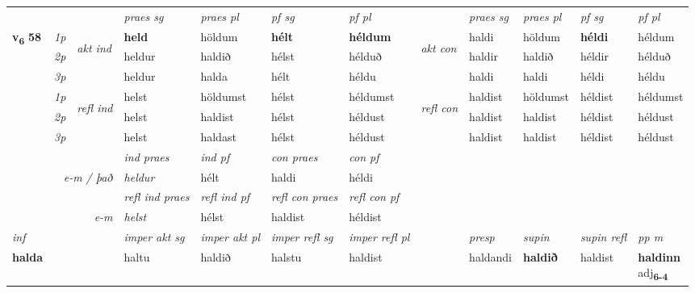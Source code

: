 \begin{longtable}[l]{X>{\footnotesize\itshape}llXXXXlXXXX}
\midrule

\midrule
 & &   & \textit{praes sg}  & \textit{praes pl}    & \textit{ pf sg} & \textit{pf pl} & & \textit{praes sg}  & \textit{praes pl}    & \textit{pf sg} & \textit{pf pl }  \\ \cmidrule{4-7} \cmidrule{9-12}
 \multirow{2}{*}{{{\textbf{v{\textsubscript{6}}} \Large{\textbf{58}}}}}  & 1p & \multirow{3}{*}{\begin{turn}{90}\textit{akt ind}\end{turn}} & \textbf{held} & höldum & \textbf{hélt} & \textbf{héldum} & \multirow{3}{*}{\begin{turn}{90}\textit{akt con}\end{turn}} &haldi & höldum & \textbf{héldi} & héldum\\*
 & 2p &  &  heldur  & haldið & hélst & hélduð & & haldir & haldið & héldir & hélduð \\*
 & 3p &  & heldur & halda & hélt & héldu & & haldi & haldi& héldi & héldu \\*
\cmidrule{4-7} \cmidrule{9-12}
 & 1p & \multirow{3}{*}{\begin{turn}{90}\textit{refl ind}\end{turn}}  & helst & höldumst & hélst & héldumst & \multirow{3}{*}{\begin{turn}{90}\textit{refl con}\end{turn}}  &haldist & höldumst & héldist & héldumst \\*
 & 2p &  & helst & haldist & hélst & héldust & &haldist & haldist & héldist & héldust \\*
 & 3p  & & helst & haldast & hélst & héldust & & haldist & haldist& héldist & héldust \\*
\cmidrule{4-7} \cmidrule{9-12}

   && &  \textit{ind praes} & \textit{ind pf} & \textit{con praes} & \textit{con pf} \\*
\multicolumn{3}{r}{\textit{e-m / það}} & heldur & hélt & haldi & héldi \\*

\cmidrule{4-7}
 & && \textit{refl ind praes} & \textit{refl ind pf} & \textit{refl con praes} & \textit{refl con pf} \\*
\multicolumn{3}{r}{\textit{e-m}}& helst & hélst & haldist & héldist \\*

\cmidrule{4-7}
   {\textit{inf}} & &  & \textit{imper akt sg} & \textit{imper akt pl} & \textit{imper refl sg} & \textit{imper refl pl} && \textit{presp} & \textit{supin} & \textit{supin refl} & \textit{pp m} \\*
  {\textbf{halda}} & && haltu  & haldið & halstu & haldist && haldandi &  \textbf{haldið} & haldist & \specialcell{\textbf{haldinn} \\ adj\textbf{\textsubscript{6-4}}} \\*


\end{longtable}
